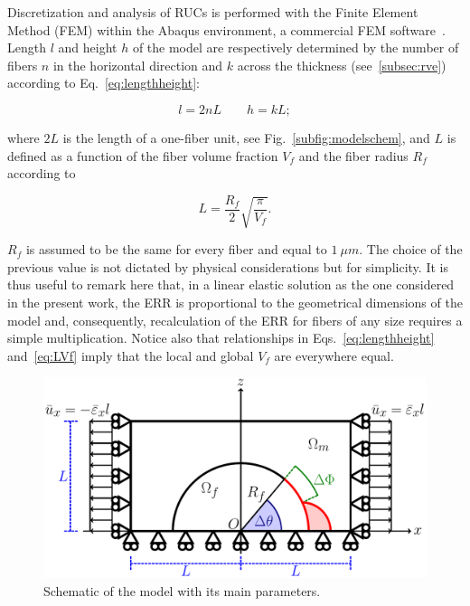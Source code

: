 \documentclass[review]{elsarticle}
\begin{document}
Discretization and analysis of RUCs is performed with the Finite Element Method (FEM) within the Abaqus environment, a commercial FEM software~\cite{abq12}. Length $l$ and height $h$ of the model are respectively determined by the number of fibers $n$ in the horizontal direction and $k$ across the thickness (see~\ref{subsec:rve}) according to Eq.~\ref{eq:lengthheight}:

\begin{equation}\label{eq:lengthheight}
l=2nL\qquad h=kL;
\end{equation}

where $2L$ is the length of a one-fiber unit, see Fig.~\ref{subfig:modelschem}, and $L$ is defined as a function of the fiber volume fraction $V_{f}$ and the fiber radius $R_{f}$ according to

\begin{equation}\label{eq:LVf}
L=\frac{R_{f}}{2}\sqrt{\frac{\pi}{V_{f}}}.
\end{equation}

$R_{f}$ is assumed to be the same for every fiber and equal to $1\ \mu m$. The choice of the previous value is not dictated by physical considerations but for simplicity. It is thus useful to remark here that, in a linear elastic solution as the one considered in the present work, the ERR is proportional to the geometrical dimensions of the model and, consequently, recalculation of the ERR for fibers of any size requires a simple multiplication. Notice also that relationships in Eqs.~\ref{eq:lengthheight} and~\ref{eq:LVf} imply that the local and global $V_{f}$ are everywhere equal.

\begin{figure}[!h]
\centering
\includegraphics[width=\textwidth]{RUC.pdf}
\caption{Schematic of the model with its main parameters.}\label{fig:modelschem}
\end{figure}
\end{document}
